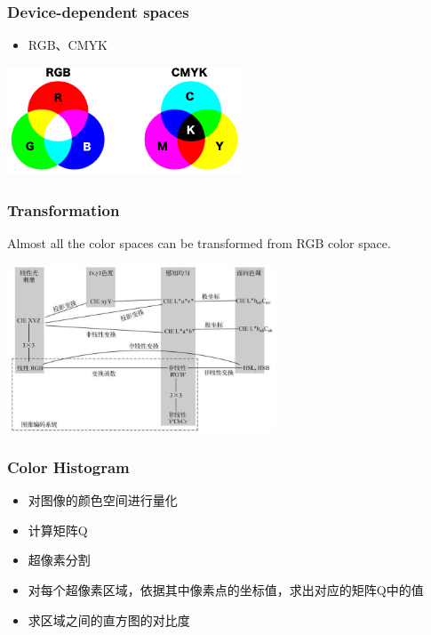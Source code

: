 \documentclass[notheorems,serif,table,compress]{beamer}  %
\begin{document}
\begin{frame}
\frametitle{Device-dependent spaces}
\begin{itemize}
\item RGB、CMYK
\end{itemize}

\centering\includegraphics[width=7cm]{RGB_CMYK.png}
\end{frame}


\begin{frame}
\frametitle{Transformation}
Almost all the color spaces can be transformed from RGB color space.

\centering\includegraphics[width=8cm]{ColorSpaceTransform}
\end{frame}


\begin{frame}
\frametitle{Color Histogram}
\begin{itemize}
\item 对图像的颜色空间进行量化
\item 计算矩阵Q
\item 超像素分割
\item 对每个超像素区域，依据其中像素点的坐标值，求出对应的矩阵Q中的值
\item 求区域之间的直方图的对比度
\end{itemize}
\end{frame}
\end{document}
